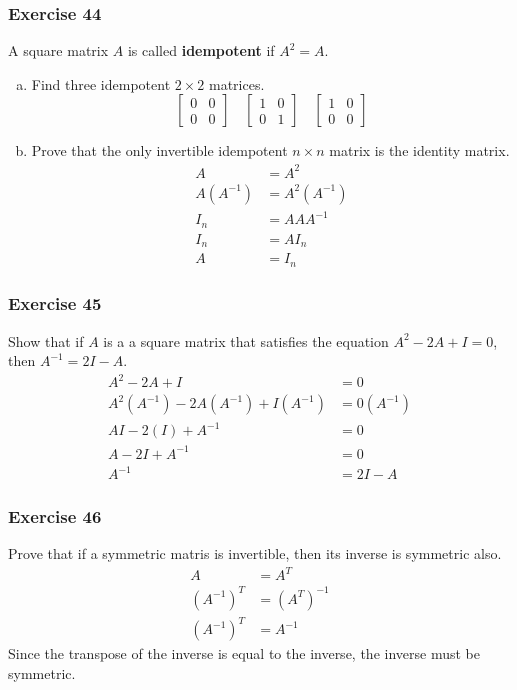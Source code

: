 \documentclass[letterpaper, 12pt]{math}
\begin{document}
\subsubsection*{Exercise 44}
A square matrix \( A \) is called \textbf{idempotent} if \( A^2 = A \).
\begin{enumerate}[(a)]
  \item Find three idempotent \( 2\times2 \) matrices.
  \[ \begin{bmatrix}0 & 0 \\ 0 & 0\end{bmatrix} \quad
    \begin{bmatrix}1 & 0 \\ 0 & 1\end{bmatrix} \quad
    \begin{bmatrix}1 & 0 \\ 0 & 0\end{bmatrix} \]
  \item Prove that the only invertible idempotent \( n\times n \) matrix is the
  identity matrix.
  \begin{align*}
    A &= A^2 \\
    A(A^{-1}) &= A^2(A^{-1}) \\
    I_n &= AAA^{-1} \\
    I_n &= AI_n \\
    A &= I_n
  \end{align*}
\end{enumerate}

\subsubsection*{Exercise 45}
Show that if \( A \) is a a square matrix that satisfies the equation
\( A^2-2A+I = 0 \), then \( A^{-1} = 2I-A \).
\begin{align*}
  A^2-2A+I &= 0 \\
  A^2(A^{-1})-2A(A^{-1})+I(A^{-1}) &= 0(A^{-1}) \\
  AI-2(I)+A^{-1} &= 0 \\
  A-2I+A^{-1} &= 0 \\
  A^{-1} &= 2I-A
\end{align*}

\subsubsection*{Exercise 46}
Prove that if a symmetric matris is invertible, then its inverse is symmetric
also.
\begin{align*}
  A &= A^T \\
  (A^{-1})^T &= (A^T)^{-1} \\
  (A^{-1})^T &= A^{-1}
\end{align*}
Since the transpose of the inverse is equal to the inverse, the inverse must be
symmetric.
\end{document}

